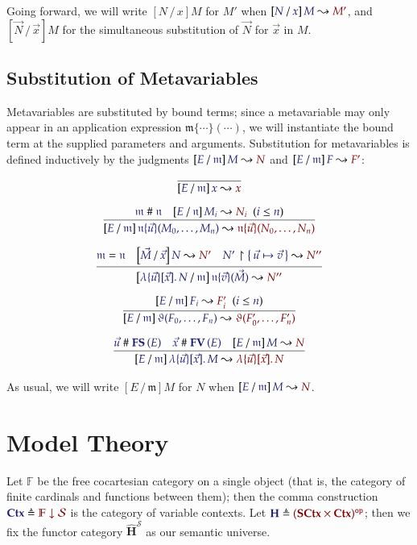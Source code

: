 \documentclass[11pt]{article}
\theoremstyle{definition}
\theoremstyle{remark}
\numberwithin{equation}{section}
\def\IModeColorName{MidnightBlue}
\def\OModeColorName{Maroon}
\newcommand\IMode[1]{{\color{\IModeColorName}{#1}}}
\newcommand\OMode[1]{{\color{\OModeColorName}{#1}}}
\newcommand\HypJ[2]{#1\ \ (#2)}
\newcommand\MkSet[1]{\left\{\,#1\,\right\}}
\newcommand\MkBTm[3]{\mathbb{\lambda}\{#1\}[#2].\, #3}
\newcommand\Leq[2]{\IMode{#1}\leq\IMode{#2}}
\newcommand\FinSets{\mathbb{F}}
\newcommand\Sorts{\mathcal{S}}
\newcommand\SCtx{\mathbf{SCtx}}
\newcommand\Ctx{\mathbf{Ctx}}
\newcommand\HypCat{\mathbf{H}}
\newcommand\OpCat[1]{#1^{\mathtt{op}}}
\newcommand\Comma[2]{#1 \downarrow#2}
\newcommand\MV[1]{\mathfrak{#1}}
\newcommand\MApp[3]{#1\{#2\}(#3)}
\newcommand\App[2]{#1(#2)}
\newcommand\FV[1]{\mathbf{FV}\left(#1\right)}
\newcommand\FS[1]{\mathbf{FS}\left(#1\right)}
\newcommand\Rename[2]{%
  #2\upharpoonright#1%
}
\newcommand\IsRenaming[3]{%
  \Rename{\IMode{#1}}{\IMode{#2}}%
  \leadsto\OMode{#3}%
}
\newcommand\Subst[3]{%
  \left[#1\, /\, #2\right]#3%
}
\newcommand\IsSubst[4]{%
  \Subst{\IMode{#1}}{\IMode{#2}}{\IMode{#3}}%
  \leadsto\OMode{#4}%
}
\newcommand\IsEq[2]{\IMode{#1} = \IMode{#2}}
\newcommand\IsApart[2]{\IMode{#1} \mathrel{\#} \IMode{#2}}
\newcommand\Define[2]{\IMode{#1}\triangleq\OMode{#2}}
\begin{document}
Going forward, we will write $\Subst{N}{x}{M}$ for $M'$ when
$\IsSubst{N}{x}{M}{M'}$, and $\Subst{\vec{N}}{\vec{x}}{M}$ for the
simultaneous substitution of $\vec{N}$ for $\vec{x}$ in $M$.

\subsection{Substitution of Metavariables}

Metavariables are substituted by bound terms; since a metavariable may only
appear in an application expression $\MApp{\MV{m}}{\cdots}{\cdots}$, we will
instantiate the bound term at the supplied parameters and arguments.
Substitution for metavariables is defined inductively by the judgments
$\IsSubst{E}{\MV{m}}{M}{N}$ and $\IsSubst{E}{\MV{m}}{F}{F'}$:

\begin{gather*}
  \infer{
    \IsSubst{E}{\MV{m}}{x}{x}
  }{
  }\\[6pt]
  \infer{
    \IsSubst{E}{\MV{m}}{
      \MApp{\MV{n}}{\vec{u}}{M_0,\dots,M_n}
    }{
      \MApp{\MV{n}}{\vec{u}}{N_0,\dots,N_n}
    }
  }{
    \IsApart{\MV{m}}{\MV{n}} &
    \HypJ{
      \IsSubst{E}{\MV{n}}{M_i}{N_i}
    }{
      \Leq{i}{n}
    }
  }\\[6pt]
  \infer{
    \IsSubst{
      \MkBTm{\vec{u}}{\vec{x}}{N}
    }{\MV{m}}{
      \MApp{\MV{n}}{\vec{v}}{\vec{M}}
    }{
      N''
    }
  }{
    \IsEq{\MV{m}}{\MV{n}} &
    \IsSubst{\vec{M}}{\vec{x}}{N}{N'} &
    \IsRenaming{\MkSet{\vec{u}\mapsto\vec{v}}}{N'}{N''}
  }\\[6pt]
  \infer{
    \IsSubst{E}{\MV{m}}{
      \App{\vartheta}{F_0,\dots,F_n}
    }{
      \App{\vartheta}{F'_0,\dots,F'_n}
    }
  }{
    \HypJ{
      \IsSubst{E}{\MV{m}}{F_i}{F'_i}
    }{
      \Leq{i}{n}
    }
  }\\[6pt]
  \infer{
    \IsSubst{E}{\MV{m}}{
      \MkBTm{\vec{u}}{\vec{x}}{M}
    }{
      \MkBTm{\vec{u}}{\vec{x}}{N}
    }
  }{
    \IsApart{\vec{u}}{\FS{E}} &
    \IsApart{\vec{x}}{\FV{E}} &
    \IsSubst{E}{\MV{m}}{M}{N}
  }
\end{gather*}

As usual, we will write $\Subst{E}{\MV{m}}{M}$ for $N$ when
$\IsSubst{E}{\MV{m}}{M}{N}$.

\section{Model Theory}

Let $\FinSets$ be the free cocartesian category on a single object (that is,
the category of finite cardinals and functions between them); then the comma
construction $\Define{\Ctx}{\Comma{\FinSets}{\Sorts}}$ is the category of
variable contexts. Let $\Define{\HypCat}{\OpCat{(\SCtx\times\Ctx)}}$; then we
fix the functor category $\widehat{\HypCat}^\Sorts$ as our semantic universe.
\end{document}
